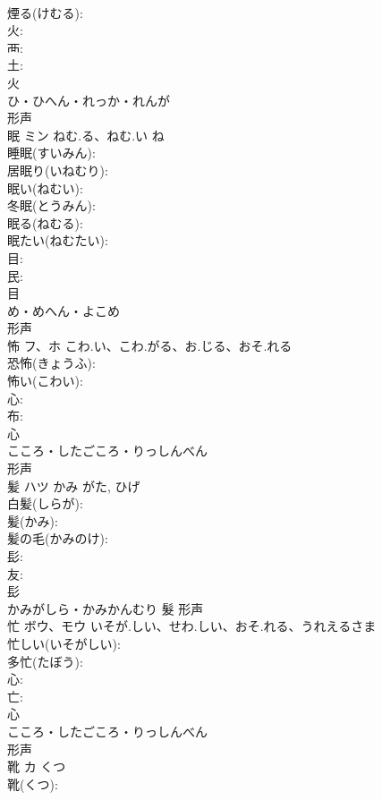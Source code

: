 \documentclass[8pt]{extreport}
\begin{document}
\begin{CJK}{UTF8}{min}
\\	煙る(けむる): 
\\	火: 
\\	襾: 
\\	土: 
\\	火	
\\	ひ・ひへん・れっか・れんが	
\\	形声 
\\	眠	ミン	ねむ.る、ねむ.い	ね	
\\	睡眠(すいみん): 
\\	居眠り(いねむり): 
\\	眠い(ねむい): 
\\	冬眠(とうみん): 
\\	眠る(ねむる): 
\\	眠たい(ねむたい): 
\\	目: 
\\	民: 
\\	目	
\\	め・めへん・よこめ	
\\	形声 
\\	怖	フ、ホ	こわ.い、こわ.がる、お.じる、おそ.れる		
\\	恐怖(きょうふ): 
\\	怖い(こわい): 
\\	心: 
\\	布: 
\\	心	
\\	こころ・したごころ・りっしんべん	
\\	形声 
\\	髪	ハツ	かみ	がた, ひげ	
\\	白髪(しらが): 
\\	髪(かみ): 
\\	髪の毛(かみのけ): 
\\	髟: 
\\	友: 
\\	髟	
\\	かみがしら・かみかんむり	髮	形声 
\\	忙	ボウ、モウ	いそが.しい、せわ.しい、おそ.れる、うれえるさま		
\\	忙しい(いそがしい): 
\\	多忙(たぼう): 
\\	心: 
\\	亡: 
\\	心	
\\	こころ・したごころ・りっしんべん	
\\	形声 
\\	靴	カ	くつ		
\\	靴(くつ): 

\end{CJK}
\end{document}
